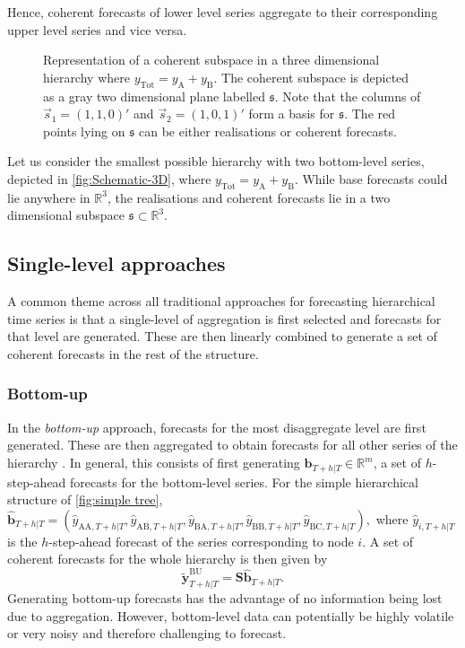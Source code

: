 \documentclass[a4paper, 11pt]{article}
\begin{document}
Hence, coherent forecasts of lower level series aggregate to their corresponding upper level series and vice versa.

\begin{figure}[!b]
	\centering
	\vspace{-0.9cm}
	\small
	\resizebox{\linewidth}{!}{
		
	}
	\caption{Representation of a coherent subspace in a three dimensional hierarchy where $y_{\text{Tot}} = y_{\text{A}} + y_{\text{B}}$. The coherent subspace is depicted as a gray two dimensional plane labelled $\mathfrak{s}$. Note that the columns of $\vec{s}_1 = (1,1,0)'$ and $\vec{s}_2 = (1, 0, 1)'$ form a basis for $\mathfrak{s}$. The red points lying on $\mathfrak{s}$ can be either realisations or coherent forecasts.}\label{fig:Schematic-3D}
\end{figure}

Let us consider the smallest possible hierarchy with two bottom-level series, depicted in \autoref{fig:Schematic-3D}, where $y_{\text{Tot}} = y_{\text{A}} + y_{\text{B}}$. While base forecasts could lie anywhere in $\mathbb{R}^3$, the realisations and coherent forecasts lie in a two dimensional subspace $\mathfrak{s}\subset \mathbb{R}^3$.

\subsection{Single-level approaches}\label{sec:single level approaches}
A common theme across all traditional approaches for forecasting hierarchical time series is that a single-level of aggregation is first selected and forecasts for that level are generated. These are then linearly combined to generate a set of coherent forecasts in the rest of the structure.

\subsubsection{Bottom-up}

In the \textit{bottom-up} approach, forecasts for the most disaggregate level are first generated. These are then aggregated to obtain forecasts for all other series of the hierarchy \citep{dunn1976}. In general, this consists of first generating $\hat{\bm{b}}_{T+h|T} \in \mathbb{R}^m$, a set of $h$-step-ahead forecasts for the bottom-level series. For the simple hierarchical structure of \autoref{fig:simple tree}, $\hat{\bm{b}}_{T+h|T} = (\hat{{y}}_{\text{AA},T+h|T}, \hat{{y}}_{\text{AB},T+h|T}, \hat{{y}}_{\text{BA},T+h|T}, \hat{{y}}_{\text{BB},T+h|T},\hat{{y}}_{\text{BC},T+h|T}),$ where $\hat{{y}}_{i,T+h|T}$ is the $h$-step-ahead forecast of the series corresponding to node $i$. A set of coherent forecasts for the whole hierarchy is then given by
\begin{equation*}\label{eq:BU}
\tilde{\bm{y}}^{\text{BU}}_{T+h|T}=\bm{S\hat{\bm{b}}}_{T+h|T}.
\end{equation*}
Generating bottom-up forecasts has the advantage of no information being lost due to aggregation. However, bottom-level data can potentially be highly volatile or very noisy and therefore challenging to forecast.
\end{document}
